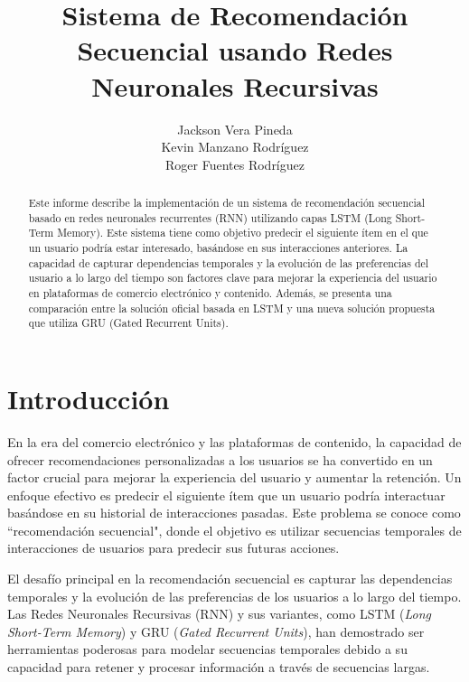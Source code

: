 \documentclass[runningheads]{llncs}
\begin{document}
\title{Sistema de Recomendación Secuencial usando Redes Neuronales Recursivas}
\author{Jackson Vera Pineda \\ Kevin Manzano Rodríguez \\ Roger Fuentes Rodríguez}

\maketitle

\begin{abstract}
Este informe describe la implementación de un sistema de recomendación secuencial basado en redes neuronales recurrentes (RNN) utilizando capas LSTM (Long Short-Term Memory). Este sistema tiene como objetivo predecir el siguiente ítem en el que un usuario podría estar interesado, basándose en sus interacciones anteriores. La capacidad de capturar dependencias temporales y la evolución de las preferencias del usuario a lo largo del tiempo son factores clave para mejorar la experiencia del usuario en plataformas de comercio electrónico y contenido. Además, se presenta una comparación entre la solución oficial basada en LSTM y una nueva solución propuesta que utiliza GRU (Gated Recurrent Units).
\end{abstract}

\section{Introducción}

En la era del comercio electrónico y las plataformas de contenido, la capacidad de ofrecer recomendaciones personalizadas a los usuarios se ha convertido en un factor crucial para mejorar la experiencia del usuario y aumentar la retención. Un enfoque efectivo es predecir el siguiente ítem que un usuario podría interactuar basándose en su historial de interacciones pasadas. Este problema se conoce como ``recomendación secuencial", donde el objetivo es utilizar secuencias temporales de interacciones de usuarios para predecir sus futuras acciones.

El desafío principal en la recomendación secuencial es capturar las dependencias temporales y la evolución de las preferencias de los usuarios a lo largo del tiempo. Las Redes Neuronales Recursivas (RNN) y sus variantes, como LSTM (\textit{Long Short-Term Memory}) y GRU (\textit{Gated Recurrent Units}), han demostrado ser herramientas poderosas para modelar secuencias temporales debido a su capacidad para retener y procesar información a través de secuencias largas.
\end{document}
